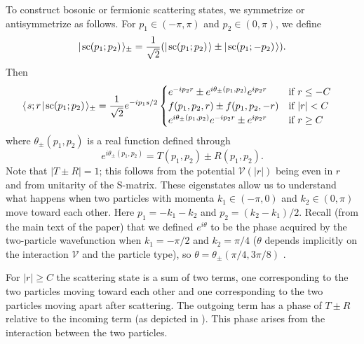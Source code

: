 \documentclass[../thesis-main/thesis-main]{subfiles}
\begin{document}
%
%
%
%
%
%	
To construct bosonic or fermionic scattering states, we symmetrize or antisymmetrize as follows. For $p_1\in (-\pi,\pi)$ and $p_2\in (0,\pi)$, we define
\[
  |\mspace{2mu} \mathrm{sc}(p_1;p_2) \mspace{2mu} \rangle_\pm = \frac{1}{\sqrt2}(|\mspace{2mu} \mathrm{sc}(p_1;p_2) \mspace{2mu} \rangle \pm |\mspace{2mu} \mathrm{sc}(p_1;-p_2) \mspace{2mu} \rangle).
\]
Then
\begin{align}
    \langle\mspace{2mu} s;r \mspace{2mu} | \mspace{2mu} \mathrm{sc}(p_1;p_2)\mspace{2mu} \rangle_\pm
      &= \frac{1}{\sqrt{2}}e^{-i p_1 s/2} \begin{cases}  e^{-i p_2 r} \pm e^{i\theta_{\pm}(p_1,p_2)} e^{i p_2 r} &  \text{if } r \leq -C\\
  	f(p_1,p_2,r) \pm f(p_1,p_2,-r) & \text{if }  |r| < C\\
  	e^{i\theta_{\pm}(p_1,p_2)}e^{- i p_2 r} \pm e^{i p_2 r}  & \text{if } r \geq C\end{cases}
\label{eq:symscatter}
\end{align}
where $\theta_{\pm}(p_1,p_2)$ is a real function defined through
\begin{equation}
e^{i\theta_{\pm}(p_1,p_2)}= T(p_1,p_2)\pm R(p_1,p_2). \label{eq:delta_pm}
\end{equation}
Note that $|T\pm R| = 1$; this follows from the potential $\mathcal{V}(|r|)$ being even in $r$ and from unitarity of the S-matrix.  These eigenstates allow us to understand what happens when two particles with momenta $k_1\in(-\pi,0)$ and $k_2\in(0,\pi)$ move toward each other. Here $p_1=-k_1-k_2$ and $p_2=(k_2-k_1)/2$.  Recall (from the main text of the paper) that we defined $e^{i\theta}$ to be the phase acquired by the two-particle wavefunction when $k_1=-{\pi}/{2}$ and $k_2={\pi}/{4}$ ($\theta$ depends implicitly on the interaction $\mathcal{V}$ and the particle type), so $\theta=\theta_\pm ({\pi}/{4},{3\pi}/{8})$ .

For $|r|\geq C$ the scattering state is a sum of two terms, one corresponding to the two particles moving toward each other and one corresponding to the two particles moving apart after scattering. The outgoing term has a  phase of $T\pm R$ relative to the incoming term (as depicted in ). This phase arises from the interaction between the two particles.
\end{document}
